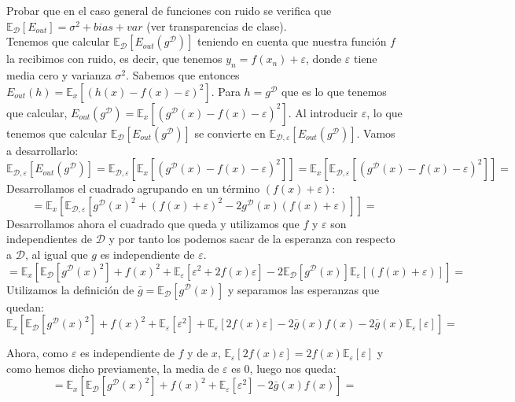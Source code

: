 \documentclass[12pt]{article}
\theoremstyle{definition}
\begin{document}
\begin{pregunta}
Probar que en el caso general de funciones con ruido se verifica que $\mathbb{E}_{\mathcal{D}}[E_{out}]=\sigma^2+bias+var$ (ver transparencias de clase).\\

Tenemos que calcular $\mathbb{E}_{\mathcal{D}}[E_{out}(g^{\mathcal{D}})]$ teniendo en cuenta que nuestra función $f$ la recibimos con ruido, es decir, que tenemos $y_n = f(x_n)+\varepsilon$, donde $\varepsilon$ tiene media cero y varianza $\sigma^2$. Sabemos que entonces $E_{out}(h)=\mathbb{E}_x[(h(x)-f(x)-\varepsilon)^2]$. Para $h=g^{\mathcal{D}}$ que es lo que tenemos que calcular, $E_{out}(g^{\mathcal{D}})=\mathbb{E}_x[(g^{\mathcal{D}}(x)-f(x)-\varepsilon)^2]$. Al introducir $\varepsilon$, lo que tenemos que calcular  $\mathbb{E}_{\mathcal{D}}[E_{out}(g^{\mathcal{D}})]$ se convierte en $\mathbb{E}_{\mathcal{D}, \varepsilon}[E_{out}(g^{\mathcal{D}})]$. Vamos a desarrollarlo:
\[	\mathbb{E}_{\mathcal{D}, \varepsilon}[E_{out}(g^{\mathcal{D}})] = \mathbb{E}_{\mathcal{D}, \varepsilon}[\mathbb{E}_x[(g^{\mathcal{D}}(x)-f(x)-\varepsilon)^2]] = \mathbb{E}_x[  \mathbb{E}_{\mathcal{D}, \varepsilon}[ (g^{\mathcal{D}}(x)-f(x)-\varepsilon)^2]] =	\]
Desarrollamos el cuadrado agrupando en un término $(f(x)+\varepsilon)$:
\[	= \mathbb{E}_x[  \mathbb{E}_{\mathcal{D}, \varepsilon}[ g^{\mathcal{D}}(x)^2 + (f(x)+\varepsilon)^2 - 2g^{\mathcal{D}}(x)(f(x)+\varepsilon)]] =	\]
Desarrollamos ahora el cuadrado que queda y utilizamos que $f$ y $\varepsilon$ son independientes de $\mathcal{D}$ y por tanto los podemos sacar de la esperanza con respecto a $\mathcal{D}$, al igual que $g$ es independiente de $\varepsilon$.
\[	= \mathbb{E}_x[  \mathbb{E}_{\mathcal{D}}[ g^{\mathcal{D}}(x)^2] + f(x)^2 + \mathbb{E}_\varepsilon[\varepsilon^2 + 2f(x)\varepsilon] - 2\mathbb{E}_{\mathcal{D}}[g^{\mathcal{D}}(x)]\mathbb{E}_\varepsilon[(f(x)+\varepsilon)]] =	\]
Utilizamos la definición de $\bar{g} = \mathbb{E}_{\mathcal{D}}[g^{\mathcal{D}}(x)]$ y separamos las esperanzas que quedan:
\[	\mathbb{E}_x[  \mathbb{E}_{\mathcal{D}}[ g^{\mathcal{D}}(x)^2] + f(x)^2 + \mathbb{E}_\varepsilon[\varepsilon^2] + \mathbb{E}_\varepsilon[2f(x)\varepsilon] - 2\bar{g}(x)f(x) - 2\bar{g}(x)\mathbb{E}_\varepsilon[\varepsilon]] =	\]

Ahora, como $\varepsilon$ es independiente de $f$ y de $x$, $\mathbb{E}_\varepsilon[2f(x)\varepsilon] = 2f(x)\mathbb{E}_\varepsilon[\varepsilon]$ y como hemos dicho previamente, la media de $\varepsilon$ es 0, luego nos queda:
\[	= \mathbb{E}_x[  \mathbb{E}_{\mathcal{D}}[ g^{\mathcal{D}}(x)^2] + f(x)^2 + \mathbb{E}_\varepsilon[\varepsilon^2] - 2\bar{g}(x)f(x)] = \]


\end{pregunta}
\end{document}
